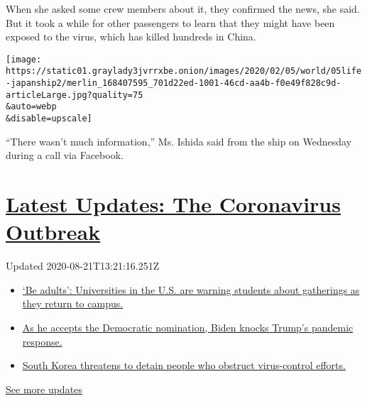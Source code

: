 When she asked some crew members about it, they confirmed the news, she
said. But it took a while for other passengers to learn that they might
have been exposed to the virus, which has killed hundreds in China.

\texttt{[image: https://static01.graylady3jvrrxbe.onion/images/2020/02/05/world/05life-japanship2/merlin\_168407595\_701d22ed-1001-46cd-aa4b-f0e49f828c9d-articleLarge.jpg?quality=75\\\&auto=webp\\\&disable=upscale]}

``There wasn't much information,'' Ms. Ishida said from the ship on
Wednesday during a call via Facebook.

\hypertarget{latest-updates-the-coronavirus-outbreak}{%
\section{\texorpdfstring{\href{https://www.nytimes3xbfgragh.onion/2020/08/21/world/covid-19-coronavirus.html?action=click\&pgtype=Article\&state=default\&region=MAIN_CONTENT_1\&context=storylines_live_updates}{Latest
Updates: The Coronavirus
Outbreak}}{Latest Updates: The Coronavirus Outbreak}}\label{latest-updates-the-coronavirus-outbreak}}

Updated 2020-08-21T13:21:16.251Z

\begin{itemize}
\tightlist
\item
  \href{https://www.nytimes3xbfgragh.onion/2020/08/21/world/covid-19-coronavirus.html?action=click\&pgtype=Article\&state=default\&region=MAIN_CONTENT_1\&context=storylines_live_updates\#link-6a60a19d}{`Be
  adults': Universities in the U.S. are warning students about
  gatherings as they return to campus.}
\item
  \href{https://www.nytimes3xbfgragh.onion/2020/08/21/world/covid-19-coronavirus.html?action=click\&pgtype=Article\&state=default\&region=MAIN_CONTENT_1\&context=storylines_live_updates\#link-324af071}{As
  he accepts the Democratic nomination, Biden knocks Trump's pandemic
  response.}
\item
  \href{https://www.nytimes3xbfgragh.onion/2020/08/21/world/covid-19-coronavirus.html?action=click\&pgtype=Article\&state=default\&region=MAIN_CONTENT_1\&context=storylines_live_updates\#link-191d44be}{South
  Korea threatens to detain people who obstruct virus-control efforts.}
\end{itemize}

\href{https://www.nytimes3xbfgragh.onion/2020/08/21/world/covid-19-coronavirus.html?action=click\&pgtype=Article\&state=default\&region=MAIN_CONTENT_1\&context=storylines_live_updates}{See
more updates}

